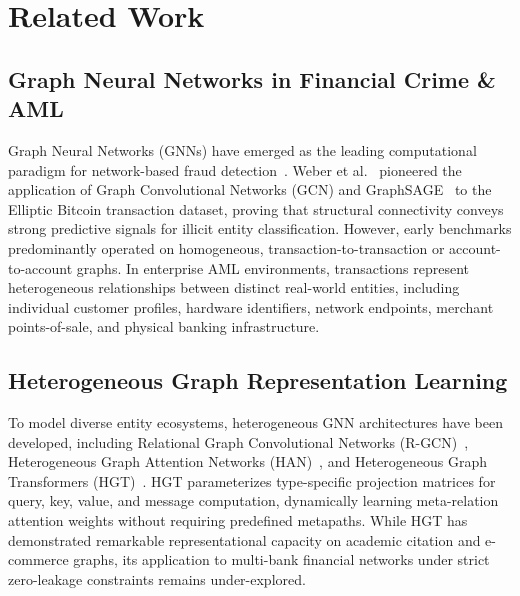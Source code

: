 \section{Related Work}
\label{sec:related}

\subsection{Graph Neural Networks in Financial Crime \&  AML}
Graph Neural Networks (GNNs) have emerged as the leading computational paradigm for network-based fraud detection~\cite{weber2019anti,savage2016anomaly,dou2020enhancing}. Weber et al.~\cite{weber2019anti} pioneered the application of Graph Convolutional Networks (GCN) and GraphSAGE~\cite{hamilton2017inductive} to the Elliptic Bitcoin transaction dataset, proving that structural connectivity conveys strong predictive signals for illicit entity classification. However, early benchmarks predominantly operated on homogeneous, transaction-to-transaction or account-to-account graphs. In enterprise AML environments, transactions represent heterogeneous relationships between distinct real-world entities, including individual customer profiles, hardware identifiers, network endpoints, merchant points-of-sale, and physical banking infrastructure.

\subsection{Heterogeneous Graph Representation Learning}
To model diverse entity ecosystems, heterogeneous GNN architectures have been developed, including Relational Graph Convolutional Networks (R-GCN)~\cite{schlichtkrull2018modeling}, Heterogeneous Graph Attention Networks (HAN)~\cite{wang2019heterogeneous}, and Heterogeneous Graph Transformers (HGT)~\cite{hu2020heterogeneous}. HGT parameterizes type-specific projection matrices for query, key, value, and message computation, dynamically learning meta-relation attention weights without requiring predefined metapaths. While HGT has demonstrated remarkable representational capacity on academic citation and e-commerce graphs, its application to multi-bank financial networks under strict zero-leakage constraints remains under-explored.

